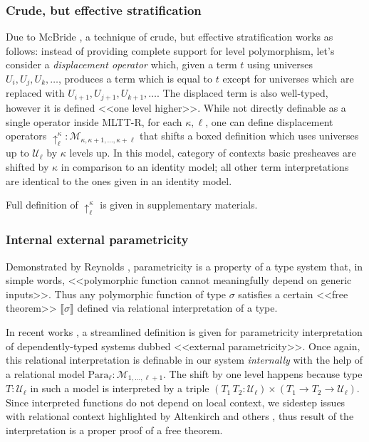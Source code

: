 \subsubsection{Crude, but effective stratification}
\label{MLTT-R-displacement}

Due to McBride \cite{McBride:Crude2011,
McBride:Crude2012}, a technique of crude, but effective
stratification works as follows: instead of providing
complete support for level polymorphism, let's consider
a \textit{displacement operator} which, given a term $t$
using universes $U_i,U_j,U_k,\ldots$, produces a term
which is equal to $t$ except for universes which are
replaced with $U_{i+1},U_{j+1},U_{k+1},\ldots$. The
displaced term is also well-typed, however it is defined
<<one level higher>>. While not directly definable as a
single operator inside MLTT-R, for each $\kappa,\ell$,
one can define displacement operators
$\uparrow_\ell^\kappa:\mathcal{M}_{\kappa,
\kappa+1,\ldots,\kappa+\ell}$ that shifts a boxed
definition which uses universes up to $\mathcal{U}_\ell$
by $\kappa$ levels up. In this model, category of
contexts basic presheaves
are shifted by $\kappa$ in comparison to an identity
model; all other term interpretations are identical to
the ones given in an identity model.

Full definition of $\uparrow_\ell^\kappa$ is given in
supplementary materials.

\subsubsection{Internal external parametricity}
\label{MLTT-R-parametricity}

Demonstrated by Reynolds \cite{reynolds1983types},
parametricity is a property of a type system that, in
simple words, <<polymorphic function cannot
meaningfully depend on generic inputs>>. Thus any
polymorphic function of type $\sigma$ satisfies a
certain <<free theorem>> $\llbracket \sigma
\rrbracket$ defined via relational interpretation of a
type.

In recent works \cite{Bernardy:Parametricity2010,
Altenkirch:Parametricity2024}, a streamlined definition
is given for parametricity interpretation of
dependently-typed systems dubbed <<external
parametricity>>. Once again, this relational
interpretation is definable in our system
\textit{internally} with the help of a relational model
$\mathrm{Para}_\ell:\mathcal{M}_{1,\ldots,\ell+1}$. The
shift by one level happens because type
$T:\mathcal{U}_\ell$ in such a model is interpreted by
a triple $(T_1\,T_2:\mathcal{U}_\ell)\times
(T_1\to T_2\to\mathcal{U}_\ell)$.
Since interpreted functions do not depend on local
context, we sidestep issues with relational context
highlighted by Altenkirch and others
\cite{Altenkirch:Parametricity2024}, thus result of the
interpretation is a proper proof of a free theorem.

